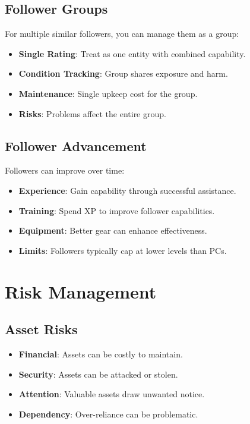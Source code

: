\begin{multicols}{2}
\subsection*{Follower Groups}
For multiple similar followers, you can manage them as a group:
\begin{itemize}
\item \textbf{Single Rating}: Treat as one entity with combined capability.
\item \textbf{Condition Tracking}: Group shares exposure and harm.
\item \textbf{Maintenance}: Single upkeep cost for the group.
\item \textbf{Risks}: Problems affect the entire group.
\end{itemize}

\subsection*{Follower Advancement}
Followers can improve over time:
\begin{itemize}
\item \textbf{Experience}: Gain capability through successful assistance.
\item \textbf{Training}: Spend XP to improve follower capabilities.
\item \textbf{Equipment}: Better gear can enhance effectiveness.
\item \textbf{Limits}: Followers typically cap at lower levels than PCs.
\end{itemize}

\section{Risk Management}

\subsection*{Asset Risks}
\begin{itemize}
\item \textbf{Financial}: Assets can be costly to maintain.
\item \textbf{Security}: Assets can be attacked or stolen.
\item \textbf{Attention}: Valuable assets draw unwanted notice.
\item \textbf{Dependency}: Over-reliance can be problematic.
\end{itemize}


\end{multicols}
